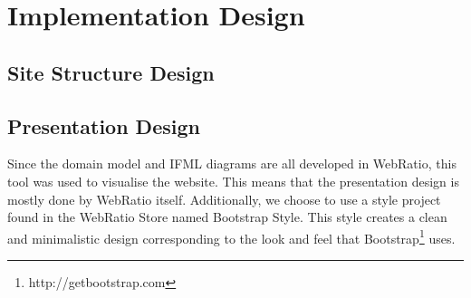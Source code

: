 \documentclass[a4paper]{report}
\begin{document}
\chapter{Implementation Design}
\section{Site Structure Design}

\section{Presentation Design}
Since the domain model and IFML diagrams are all developed in WebRatio, this tool was used to visualise the website.
This means that the presentation design is mostly done by WebRatio itself. Additionally, we choose to use a style project found in the WebRatio Store named Bootstrap Style. This style creates a clean and minimalistic design corresponding to the look and feel that Bootstrap\footnote{http://getbootstrap.com} uses.
\end{document}

